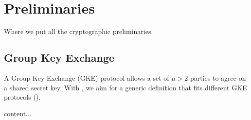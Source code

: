 \section{Preliminaries}\label{sec:preliminaries}
Where we put all the cryptographic preliminaries.

\subsection{Group Key Exchange}
A Group Key Exchange (GKE) protocol allows a set of $\mu > 2$ parties to agree on a shared secret key.
With , we aim for a generic definition that fits different GKE protocols ().

\begin{plaindef}\label{def:GKE}
	content...
\end{plaindef}